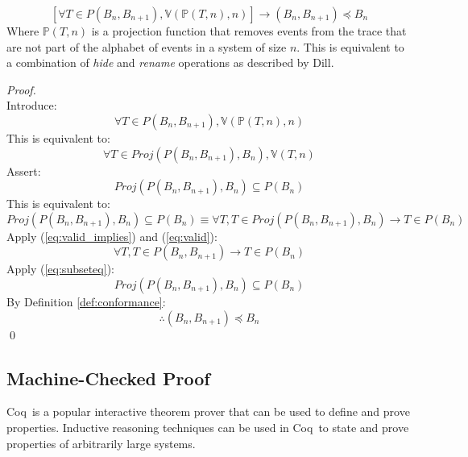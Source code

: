 \documentclass[runningheads]{llncs}
\newcommand{\actsvalid}[2]{\mathds{V}(#1, #2)}
\newcommand{\projectsize}[2]{\mathds{P}(#1, #2)}
\newcommand{\projalpha}[2]{\mathit{Proj}(#1, #2)}
\newcommand{\coq}{Coq}
\begin{document}
\begin{theorem}
\label{thm:valid_imp_conf}
$$
\left[ \forall T \in P(B_n, B_{n+1}), \actsvalid{\projectsize{T}{n}}{n} \right] \longrightarrow (B_n, B_{n+1}) \preceq B_n
$$
Where $\projectsize{T}{n}$ is a projection function that removes events from the trace that are not part of the alphabet of events in a system of size $n$. This is equivalent to a combination of \emph{hide} and \emph{rename} operations as described by Dill. 
\begin{proof}\ \\
Introduce: 
\begin{equation}
\forall T \in P(B_n, B_{n+1}), \actsvalid{\projectsize{T}{n}}{n}
\end{equation}
This is equivalent to:
\begin{equation}
\label{eq:valid}
\forall T \in \projalpha{P(B_n, B_{n+1})}{B_n}, \actsvalid{T}{n}
\end{equation}
Assert:
\begin{equation}
\projalpha{P(B_n, B_{n+1})}{B_n} \subseteq P(B_n)
\end{equation}
This is equivalent to:
\begin{equation}
\label{eq:subseteq}
\projalpha{P(B_n, B_{n+1})}{B_n} \subseteq P(B_n) \equiv \forall T, T \in \projalpha{P(B_n, B_{n+1})}{B_n} \longrightarrow T \in P(B_n)
\end{equation}
Apply (\ref{eq:valid_implies}) and (\ref{eq:valid}):
\begin{equation}
\forall T, T \in P(B_n, B_{n+1}) \longrightarrow T \in P(B_n)
\end{equation}
Apply (\ref{eq:subseteq}):
\begin{equation}
    \label{eq:goal2}
    \projalpha{P(B_n, B_{n+1})}{B_n} \subseteq P(B_n)
\end{equation}
By Definition \ref{def:conformance}:
\begin{equation}
\therefore (B_n, B_{n+1}) \preceq B_n
\end{equation}
\qed
\end{proof}
\end{theorem}

\subsection{Machine-Checked Proof}
\coq\ is a popular interactive theorem prover that can be used to define and prove properties. Inductive reasoning techniques can be used in \coq\ to state and prove properties of arbitrarily large systems. 
\end{document}

